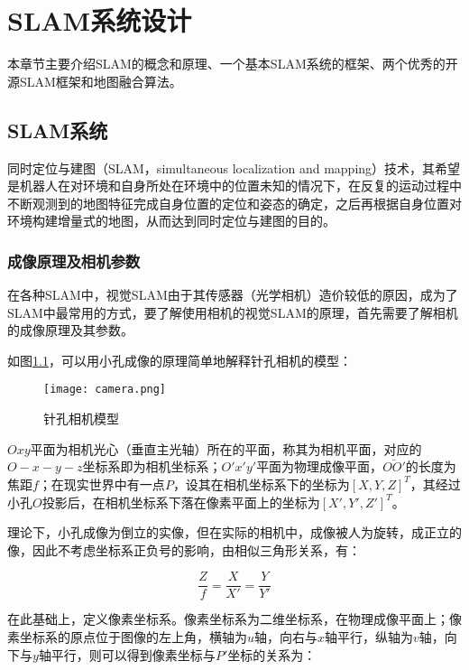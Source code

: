 \renewcommand{\baselinestretch}{1.5}
\fontsize{12pt}{13pt}\selectfont

\chapter{SLAM系统设计} \label{System Overview}
本章节主要介绍SLAM的概念和原理、一个基本SLAM系统的框架、两个优秀的开源SLAM框架和地图融合算法。

\section{SLAM系统}
同时定位与建图（SLAM，simultaneous localization and mapping）技术，其希望是机器人在对环境和自身所处在环境中的位置未知的情况下，在反复的运动过程中不断观测到的地图特征完成自身位置的定位和姿态的确定，之后再根据自身位置对环境构建增量式的地图，从而达到同时定位与建图的目的。


\subsection{成像原理及相机参数} \label{3.1.2}
在各种SLAM中，视觉SLAM由于其传感器（光学相机）造价较低的原因，成为了SLAM中最常用的方式，要了解使用相机的视觉SLAM的原理，首先需要了解相机的成像原理及其参数。

如图\ref{fig4}，可以用小孔成像的原理简单地解释针孔相机的模型：
\begin{figure}[!ht]
	\centering
	\texttt{[image: camera.png]}
	\caption{针孔相机模型} 
	\label{fig4}
\end{figure}

$Oxy$平面为相机光心（垂直主光轴）所在的平面，称其为相机平面，对应的$O-x-y-z$坐标系即为相机坐标系；$O'x'y'$平面为物理成像平面，$\bar{OO'}$的长度为焦距$f$；在现实世界中有一点$P$，设其在相机坐标系下的坐标为$[X, Y, Z]^T$，其经过小孔$O$投影后，在相机坐标系下落在像素平面上的坐标为$[X', Y', Z']^T$。

理论下，小孔成像为倒立的实像，但在实际的相机中，成像被人为旋转，成正立的像，因此不考虑坐标系正负号的影响，由相似三角形关系，有：

\begin{equation}
\frac{Z}{f}=\frac{X}{X'}=\frac{Y}{Y'}
\end{equation}


在此基础上，定义像素坐标系。像素坐标系为二维坐标系，在物理成像平面上；像素坐标系的原点位于图像的左上角，横轴为$u$轴，向右与$x$轴平行，纵轴为$v$轴，向下与$y$轴平行，则可以得到像素坐标与$P'$坐标的关系为：

